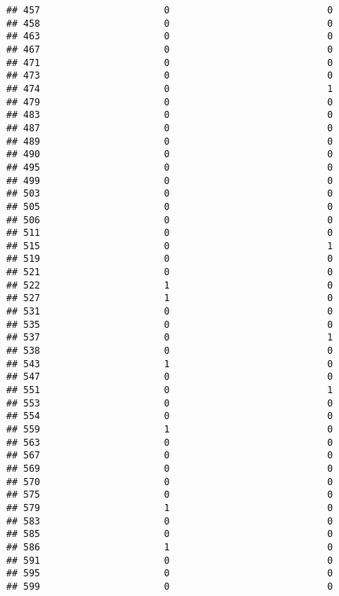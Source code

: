 \documentclass[
]{article}
\begin{document}
\begin{verbatim}
## 457                      0                            0
## 458                      0                            0
## 463                      0                            0
## 467                      0                            0
## 471                      0                            0
## 473                      0                            0
## 474                      0                            1
## 479                      0                            0
## 483                      0                            0
## 487                      0                            0
## 489                      0                            0
## 490                      0                            0
## 495                      0                            0
## 499                      0                            0
## 503                      0                            0
## 505                      0                            0
## 506                      0                            0
## 511                      0                            0
## 515                      0                            1
## 519                      0                            0
## 521                      0                            0
## 522                      1                            0
## 527                      1                            0
## 531                      0                            0
## 535                      0                            0
## 537                      0                            1
## 538                      0                            0
## 543                      1                            0
## 547                      0                            0
## 551                      0                            1
## 553                      0                            0
## 554                      0                            0
## 559                      1                            0
## 563                      0                            0
## 567                      0                            0
## 569                      0                            0
## 570                      0                            0
## 575                      0                            0
## 579                      1                            0
## 583                      0                            0
## 585                      0                            0
## 586                      1                            0
## 591                      0                            0
## 595                      0                            0
## 599                      0                            0

\end{verbatim}
\end{document}
